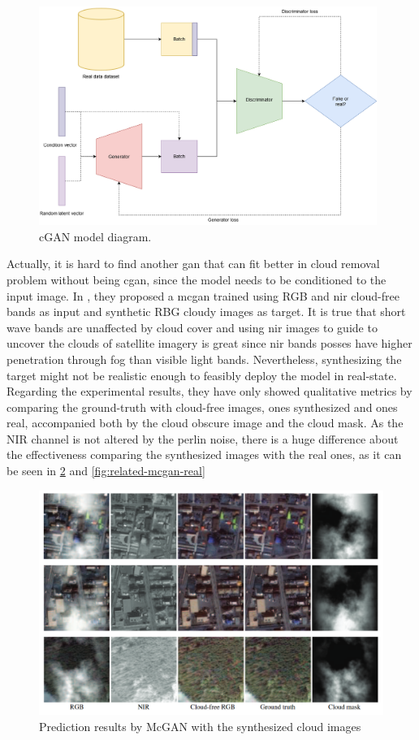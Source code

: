 \documentclass[11pt, a4paper]{article}
\begin{document}
	\begin{figure}[H]
		\centering
		\includegraphics[width=11cm]{imgs/relatedwork/cgan.png}
		\caption{cGAN model diagram.}
		\label{fig:related-cgan-diagram}
	\end{figure}	
	Actually, it is hard to find another \gls{gan} that can fit better in cloud removal problem without being \gls{cgan}, since the model needs to be conditioned to the input image. In \cite{8014931}, they %
	proposed a  \gls{mcgan} trained using RGB and \gls{nir} cloud-free bands as input and synthetic RBG cloudy images as target. It is true that short wave bands are unaffected by cloud cover and using \gls{nir} images to guide to uncover the clouds of satellite imagery is great since \gls{nir} bands posses have higher penetration through fog than visible light bands. Nevertheless, synthesizing the target might not be realistic enough to feasibly deploy the model in real-state. Regarding the experimental results, they have only showed qualitative metrics by comparing the ground-truth with cloud-free images, ones synthesized and ones real, accompanied both by the cloud obscure image and the cloud mask.  As the NIR channel is not altered by the perlin noise, there is a huge difference about the effectiveness comparing the synthesized images with the real ones, as it can be seen in \ref{fig:related-mcgan-synthesized} and \ref{fig:related-mcgan-real}
	\begin{figure}[H]
		\centering
		\includegraphics[width=12cm]{imgs/relatedwork/mcgan-synthesized.png}
		\caption{Prediction results by McGAN with the synthesized cloud images}
		\label{fig:related-mcgan-synthesized}
	\end{figure}
\end{document}
